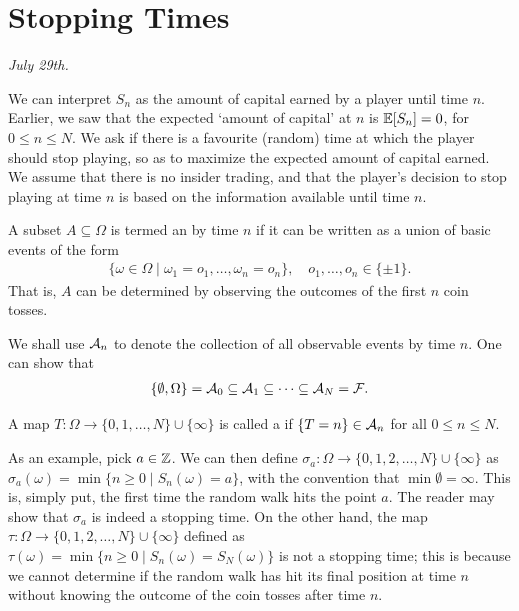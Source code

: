 \section{Stopping Times}
\noindent \textit{July 29th.}

We can interpret $S_{n}$ as the amount of capital earned by a player until time $n$. Earlier, we saw that the expected `amount of capital' at $n$ is $\mathbb{E}[S_{n}] = 0$, for $0 \leq n \leq N$. We ask if there is a favourite (random) time at which the player should stop playing, so as to maximize the expected amount of capital earned. We assume that there is no insider trading, and that the player's decision to stop playing at time $n$ is based on the information available until time $n$.

\begin{definition}
    A subset $A \subseteq \Omega$ is termed an  by time $n$ if it can be written as a union of basic events of the form
    \begin{align}
        \{\omega \in \Omega \mid \omega_{1}=o_{1}, \ldots, \omega_{n}=o_{n}\}, \quad o_{1},\ldots,o_{n} \in \{\pm 1\}.
    \end{align}
    That is, $A$ can be determined by observing the outcomes of the first $n$ coin tosses.
\end{definition}

We shall use $\mathcal{A}_{n}$ to denote the collection of all observable events by time $n$. One can show that
\begin{align}
    \{\emptyset,\Omega\} = \mathcal{A}_{0} \subseteq \mathcal{A}_{1} \subseteq \cdots \subseteq \mathcal{A}_{N} = \mathcal{F}.
\end{align}

\begin{definition}
    A map $T:\Omega \to \{0,1,\ldots,N\} \cup \{\infty\}$ is called a  if $\{T=n\} \in \mathcal{A}_{n}$ for all $0 \leq n \leq N$. 
\end{definition}

As an example, pick $a \in \mathbb{Z}$. We can then define $\sigma_{a}:\Omega \to \{0,1,2,\ldots,N\} \cup \{\infty\}$ as $\sigma_{a}(\omega) = \min\{n \geq 0 \mid S_{n}(\omega) = a\}$, with the convention that $\min \emptyset = \infty$. This is, simply put, the first time the random walk hits the point $a$. The reader may show that $\sigma_{a}$ is indeed a stopping time. On the other hand, the map $\tau:\Omega \to \{0,1,2,\ldots,N\} \cup \{\infty\}$ defined as $\tau(\omega) = \min\{n \geq 0 \mid S_{n}(\omega) = S_{N}(\omega)\}$ is not a stopping time; this is because we cannot determine if the random walk has hit its final position at time $n$ without knowing the outcome of the coin tosses after time $n$.

